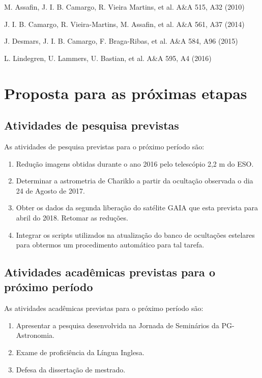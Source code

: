 \documentclass[a4paper, 11pt]{article}
\begin{document}
\noindent M. Assafin, J. I. B. Camargo, R. Vieira Martins, et al. A\&A 515, A32 (2010)

\noindent J. I. B. Camargo, R. Vieira-Martins, M. Assafin, et al. A\&A 561, A37 (2014)

\noindent J. Desmars, J. I. B. Camargo, F. Braga-Ribas, et al. A\&A 584, A96 (2015) 

\noindent L. Lindegren, U. Lammers, U. Bastian, et al. A\&A 595, A4 (2016)
\vspace{-0.3 cm}
\section{Proposta para as próximas etapas}

\subsection{Atividades de pesquisa previstas}
% 
% 
As atividades de pesquisa previstas para o pr\'oximo per\'iodo s\~ao:

\begin{enumerate}
\item Redução imagens obtidas durante o ano 2016 pelo telescópio 2,2 m do ESO.
\item Determinar a astrometria de Chariklo a partir da ocultação observada o dia 24 de Agosto de 2017. 
\item Obter os dados da segunda liberação do satélite GAIA que esta prevista para abril do 2018. Retomar as redu\c c\~oes.
\item Integrar os scripts utilizados na atualiza\c c\~ao do banco de oculta\c c\~oes estelares para obtermos um procedimento autom\'atico para tal tarefa.
\end{enumerate}
\subsection{Atividades acadêmicas previstas para o próximo período}

As atividades acadêmicas previstas para o pr\'oximo per\'iodo s\~ao:

\begin{enumerate}[resume]
  \item Apresentar a pesquisa desenvolvida na Jornada de Seminários da PG-Astronomia.
  \item Exame de proficiência da L\'ingua Inglesa.
  \item Defesa da dissertação de mestrado.  
\end{enumerate}
\newpage
\end{document}
